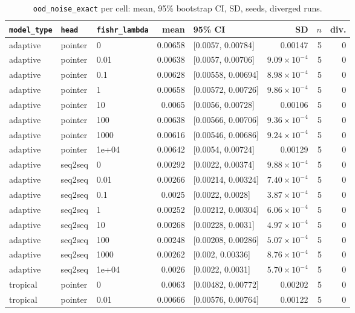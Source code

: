 \documentclass[10pt]{article}
\begin{document}
{\small
\begin{longtable}{lllrlrrr}
\caption{\texttt{ood\_noise\_exact} per cell: mean, 95\% bootstrap CI, SD, seeds, diverged runs.}\label{tab:summary-ood_noise_exact}\\
\toprule
\texttt{model\_type} & \texttt{head} & \texttt{fishr\_lambda} & mean & 95\% CI & SD & $n$ & div.\\
\midrule
\endhead
adaptive & pointer & 0 & 0.00658 & [0.0057, 0.00784] & 0.00147 & 5 & 0\\
adaptive & pointer & 0.01 & 0.00638 & [0.0057, 0.00706] & $9.09\times10^{-4}$ & 5 & 0\\
adaptive & pointer & 0.1 & 0.00628 & [0.00558, 0.00694] & $8.98\times10^{-4}$ & 5 & 0\\
adaptive & pointer & 1 & 0.00658 & [0.00572, 0.00726] & $9.86\times10^{-4}$ & 5 & 0\\
adaptive & pointer & 10 & 0.0065 & [0.0056, 0.00728] & 0.00106 & 5 & 0\\
adaptive & pointer & 100 & 0.00638 & [0.00566, 0.00706] & $9.36\times10^{-4}$ & 5 & 0\\
adaptive & pointer & 1000 & 0.00616 & [0.00546, 0.00686] & $9.24\times10^{-4}$ & 5 & 0\\
adaptive & pointer & 1e+04 & 0.00642 & [0.0054, 0.00724] & 0.00129 & 5 & 0\\
adaptive & seq2seq & 0 & 0.00292 & [0.0022, 0.00374] & $9.88\times10^{-4}$ & 5 & 0\\
adaptive & seq2seq & 0.01 & 0.00266 & [0.00214, 0.00324] & $7.40\times10^{-4}$ & 5 & 0\\
adaptive & seq2seq & 0.1 & 0.0025 & [0.0022, 0.0028] & $3.87\times10^{-4}$ & 5 & 0\\
adaptive & seq2seq & 1 & 0.00252 & [0.00212, 0.00304] & $6.06\times10^{-4}$ & 5 & 0\\
adaptive & seq2seq & 10 & 0.00268 & [0.00228, 0.0031] & $4.97\times10^{-4}$ & 5 & 0\\
adaptive & seq2seq & 100 & 0.00248 & [0.00208, 0.00286] & $5.07\times10^{-4}$ & 5 & 0\\
adaptive & seq2seq & 1000 & 0.00262 & [0.002, 0.00336] & $8.76\times10^{-4}$ & 5 & 0\\
adaptive & seq2seq & 1e+04 & 0.0026 & [0.0022, 0.0031] & $5.70\times10^{-4}$ & 5 & 0\\
tropical & pointer & 0 & 0.0063 & [0.00482, 0.00772] & 0.00202 & 5 & 0\\
tropical & pointer & 0.01 & 0.00666 & [0.00576, 0.00764] & 0.00122 & 5 & 0\\

\end{longtable}}
\end{document}
